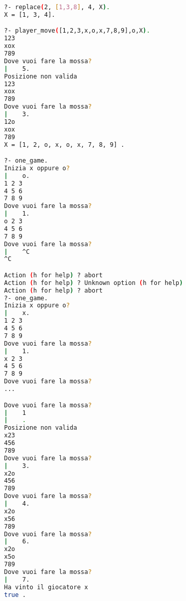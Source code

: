 \documentclass[a4paper,12pt, oneside]{book}
\begin{document}
\begin{esercizio}
\begin{shaded}
\begin{lstlisting}[language=bash]
?- replace(2, [1,3,8], 4, X).
X = [1, 3, 4].

?- player_move([1,2,3,x,o,x,7,8,9],o,X).
123
xox
789
Dove vuoi fare la mossa?
|    5.
Posizione non valida
123
xox
789
Dove vuoi fare la mossa?
|    3.
12o
xox
789
X = [1, 2, o, x, o, x, 7, 8, 9] .

?- one_game.
Inizia x oppure o?
|    o.
1 2 3 
4 5 6 
7 8 9 
Dove vuoi fare la mossa?
|    1.
o 2 3 
4 5 6 
7 8 9 
Dove vuoi fare la mossa?
|    ^C
^C

Action (h for help) ? abort
Action (h for help) ? Unknown option (h for help)
Action (h for help) ? abort
?- one_game.
Inizia x oppure o?
|    x.
1 2 3 
4 5 6 
7 8 9 
Dove vuoi fare la mossa?
|    1.
x 2 3 
4 5 6 
7 8 9 
Dove vuoi fare la mossa?
...

Dove vuoi fare la mossa?
|    1
|    .
Posizione non valida
x23
456
789
Dove vuoi fare la mossa?
|    3.
x2o
456
789
Dove vuoi fare la mossa?
|    4.
x2o
x56
789
Dove vuoi fare la mossa?
|    6.
x2o
x5o
789
Dove vuoi fare la mossa?
|    7.
Ha vinto il giocatore x
true .

\end{lstlisting}
\end{shaded}
\end{esercizio}
\newpage
\end{document}
